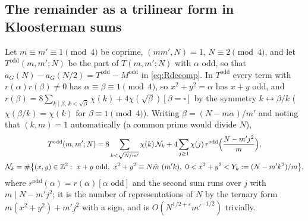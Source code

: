 \documentclass[11pt]{amsart}
\theoremstyle{remark}
\newcommand{\Z}{\mathbb{Z}}
\newcommand{\e}{\varepsilon}
\begin{document}
\subsection{The remainder as a trilinear form in Kloosterman sums}\label{subsec:trilinear}
Let $m\equiv m'\equiv1\pmod4$ be coprime, $(mm',N)=1$, $N\equiv2\pmod4$, and let $T^{\mathrm{odd}}(m,m';N)$ be the part of $T(m,m';N)$ with $\alpha$ odd, so that $a_G(N)-a_G(N/2)=T^{\mathrm{odd}}-M^{\mathrm{odd}}$ in \eqref{eq:Rdecomp}. In $T^{\mathrm{odd}}$ every term with $r(\alpha)r(\beta)\ne0$ has $\alpha\equiv\beta\equiv1\pmod4$, so $x^2+y^2=\alpha$ has $x+y$ odd, and $r(\beta)=8\sum_{k\mid\beta,\,k<\sqrt\beta}\chi(k)+4\chi(\sqrt\beta)[\beta=\square]$ by the symmetry $k\leftrightarrow\beta/k$ ($\chi(\beta/k)=\chi(k)$ for $\beta\equiv1\pmod 4$). Writing $\beta=(N-m\alpha)/m'$ and noting that $(k,m)=1$ automatically (a common prime would divide $N$),
\begin{gather}
T^{\mathrm{odd}}(m,m';N)=8\sum_{k<\sqrt{N/m'}}\chi(k)\,\mathcal N_k+4\sum_{j\ge1}\chi(j)\,r^{\mathrm{odd}}\Bigl(\frac{N-m'j^2}{m}\Bigr),\label{eq:Todd}\\
\mathcal N_k=\#\bigl\{(x,y)\in\Z^2:\ x+y\text{ odd},\ x^2+y^2\equiv N\bar m\ (m'k),\ 0<x^2+y^2<Y_k:=(N-m'k^2)/m\bigr\},\notag
\end{gather}
where $r^{\mathrm{odd}}(\alpha)=r(\alpha)[\alpha\text{ odd}]$ and the second sum runs over $j$ with $m\mid N-m'j^2$; it is the number of representations of $N$ by the ternary form $m(x^2+y^2)+m'j^2$ with a sign, and is $O(N^{1/2+\e}m'^{-1/2})$ trivially.
\end{document}
